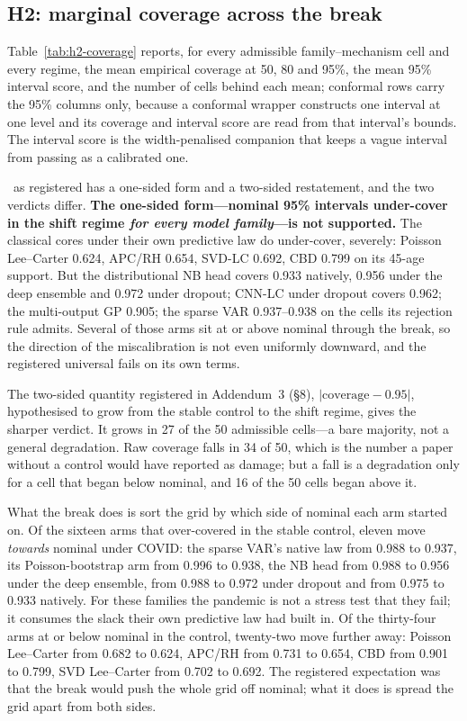 \subsection{H2: marginal coverage across the break}


Table~\ref{tab:h2-coverage} reports, for every admissible family--mechanism
cell and every regime, the mean empirical coverage at 50, 80 and 95\%, the
mean 95\% interval score, and the number of cells behind each mean;
conformal rows carry the 95\% columns only, because a conformal wrapper
constructs one interval at one level and its coverage and interval score
are read from that interval's bounds. The interval score is the
width-penalised companion that keeps a vague interval from passing as a
calibrated one.

\Htwo\ as registered has a one-sided form and a two-sided restatement, and
the two verdicts differ. \textbf{The one-sided form---nominal 95\%
intervals under-cover in the shift regime \emph{for every model
family}---is not supported.} The classical cores under their own
predictive law do under-cover, severely: Poisson Lee--Carter 0.624,
APC/RH 0.654, SVD-LC 0.692, CBD 0.799 on its 45-age support. But the
distributional NB head covers 0.933 natively, 0.956 under the deep
ensemble and 0.972 under dropout; CNN-LC under dropout covers 0.962; the
multi-output GP 0.905; the sparse VAR 0.937--0.938 on the cells its
rejection rule admits. Several of those arms sit at or above nominal
through the break, so the direction of the miscalibration is not even
uniformly downward, and the registered universal fails on its own terms.

The two-sided quantity registered in Addendum~3 (\S8),
$|\text{coverage}-0.95|$, hypothesised to grow from the stable control to
the shift regime, gives the sharper verdict. It grows in 27 of the 50
admissible cells---a bare majority, not a general degradation. Raw
coverage falls in 34 of 50, which is the number a paper without a control
would have reported as damage; but a fall is a degradation only for a cell
that began below nominal, and 16 of the 50 cells began above it.

What the break does is sort the grid by which side of nominal each arm
started on. Of the sixteen arms that over-covered in the stable control,
eleven move \emph{towards} nominal under COVID: the sparse VAR's native
law from 0.988 to 0.937, its Poisson-bootstrap arm from 0.996 to 0.938,
the NB head from 0.988 to 0.956 under the deep ensemble, from 0.988 to
0.972 under dropout and from 0.975 to 0.933 natively. For these families
the pandemic is not a stress test that they fail; it consumes the slack
their own predictive law had built in. Of the thirty-four arms at or below
nominal in the control, twenty-two move further away: Poisson Lee--Carter
from 0.682 to 0.624, APC/RH from 0.731 to 0.654, CBD from 0.901 to 0.799,
SVD Lee--Carter from 0.702 to 0.692. The registered expectation was that
the break would push the whole grid off nominal; what it does is spread
the grid apart from both sides.

